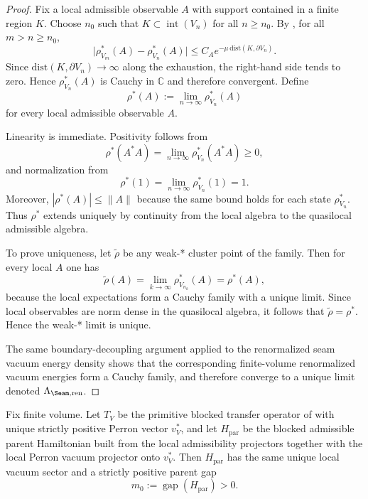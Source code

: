 \begin{proof}
Fix a local admissible observable $A$ with support contained in a finite region $K$. Choose $n_0$
such that $K\subset \operatorname{int}(V_n)$ for all $n\ge n_0$. By
, for all $m>n\ge n_0$,
\[
\bigl|\rho^*_{V_m}(A)-\rho^*_{V_n}(A)\bigr|
\le
C_A e^{-\mu\,\mathrm{dist}(K,\partial V_n)}.
\]
Since $\mathrm{dist}(K,\partial V_n)\to\infty$ along the exhaustion, the right-hand side tends to
zero. Hence $\rho^*_{V_n}(A)$ is Cauchy in $\mathbb C$ and therefore convergent. Define
\[
\rho^*(A):=\lim_{n\to\infty}\rho^*_{V_n}(A)
\]
for every local admissible observable $A$.

Linearity is immediate. Positivity follows from
\[
\rho^*(A^*A)=\lim_{n\to\infty}\rho^*_{V_n}(A^*A)\ge 0,
\]
and normalization from
\[
\rho^*(1)=\lim_{n\to\infty}\rho^*_{V_n}(1)=1.
\]
Moreover, $|\rho^*(A)|\le \|A\|$ because the same bound holds for each state $\rho^*_{V_n}$. Thus
$\rho^*$ extends uniquely by continuity from the local algebra to the quasilocal admissible
algebra.

To prove uniqueness, let $\widetilde\rho$ be any weak-* cluster point of the family. Then for every
local $A$ one has
\[
\widetilde\rho(A)=\lim_{k\to\infty}\rho^*_{V_{n_k}}(A)=\rho^*(A),
\]
because the local expectations form a Cauchy family with a unique limit. Since local observables are
norm dense in the quasilocal algebra, it follows that $\widetilde\rho=\rho^*$. Hence the weak-*
limit is unique.

The same boundary-decoupling argument applied to the renormalized seam vacuum energy density shows
that the corresponding finite-volume renormalized vacuum energies form a Cauchy family, and
therefore converge to a unique limit denoted $\Lambda_{\Seam,\mathrm{ren}}$.
\end{proof}

\begin{lemma}
\label{lem:parent-gap-from-transfer-block}
Fix finite volume. Let $T_V$ be the primitive blocked transfer operator of
 with unique strictly positive Perron vector $v_V^\ast$, and
let $H_{\mathrm{par}}$ be the blocked admissible parent Hamiltonian built from the local
admissibility projectors together with the local Perron vacuum projector onto $v_V^\ast$. Then
$H_{\mathrm{par}}$ has the same unique local vacuum sector and a strictly positive parent gap
\[
m_0:=\operatorname{gap}(H_{\mathrm{par}})>0.
\]
\end{lemma}

